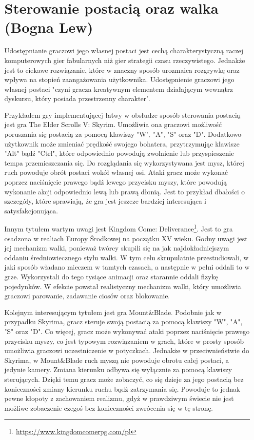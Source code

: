 \section{Sterowanie postacią oraz walka (Bogna Lew)}\label{s:walka}
Udostępnianie graczowi jego własnej postaci jest cechą charakterystyczną raczej komputerowych gier fabularnych niż gier
strategii czasu rzeczywistego. Jednakże jest to ciekawe rozwiązanie, które w znaczny sposób urozmaica rozgrywkę oraz
wpływa na stopień zaangażowania użytkownika. Udostępnienie graczowi jego własnej postaci "czyni gracza kreatywnym
elementem działającym wewnątrz dyskursu, który posiada przestrzenny charakter"\cite{olbrzymwcieniu}.

Przykładem gry implementującej łatwy w obsłudze sposób sterowania postacią jest gra The Elder Scrolls V: Skyrim. Umożliwia
ona graczowi możliwość poruszania się postacią za pomocą klawiszy "W", "A", "S" oraz "D". Dodatkowo użytkownik może
zmieniać prędkość swojego bohatera, przytrzymując klawisze "Alt" bądź "Ctrl", które odpowiednio powodują zwolnienie lub
przyspieszenie tempa przemieszczania się. Do rozglądania się wykorzystywana jest mysz, której ruch powoduje obrót postaci
wokół własnej osi. Ataki gracz może wykonać poprzez naciśnięcie prawego bądź lewego przycisku myszy, które powodują
wykonanie akcji odpowiednio lewą lub prawą dłonią. Jest to przykład dbałości o szczegóły, które sprawiają, że gra
jest jeszcze bardziej interesująca i satysfakcjonująca.

Innym tytułem wartym uwagi jest Kingdom Come: Deliverance\footnote{\url{https://www.kingdomcomerpg.com/pl}}. Jest to gra osadzona w realiach Europy Środkowej na początku
XV wieku. Godny uwagi jest jej mechanizm walki, ponieważ twórcy skupili się na jak najdokładniejszym oddaniu średniowiecznego
stylu walki. W tym celu skrupulatnie przestudiowali, w jaki sposób władano mieczem w tamtych czasach, a następnie w
pełni oddali to w grze. Wykorzystali do tego tysiące animacji oraz starannie oddali fizykę pojedynków. W efekcie powstał
realistyczny mechanizm walki, który umożliwia graczowi parowanie, zadawanie ciosów oraz blokowanie.

Kolejnym interesującym tytułem jest gra Mount\&Blade. Podobnie jak w przypadku Skyrima, gracz steruje swoją postacią za
pomocą klawiszy  "W", "A", "S" oraz "D". Co więcej, gracz może wykonywać ataki poprzez naciśnięcie prawego przycisku myszy, co jest typowym rozwiązaniem w grach,
które w prosty sposób umożliwia graczowi uczestniczenie w potyczkach. Jednakże w przeciwnieństwie do Skyrima, w Mount\&Blade ruch myszą nie powoduje obrotu całej postaci,
a jedynie kamery. Zmiana kierunku odbywa się wyłącznie za pomocą klawiszy sterujących. Dzięki temu gracz może zobaczyć, co
się dzieje za jego postacią bez konieczności zmiany kierunku ruchu bądź zatrzymania się. Powoduje to jednak pewne kłopoty z zachowaniem
realizmu, gdyż w prawdziwym świecie nie jest możliwe zobaczenie czegoś bez konieczności zwrócenia się w tę stronę.

